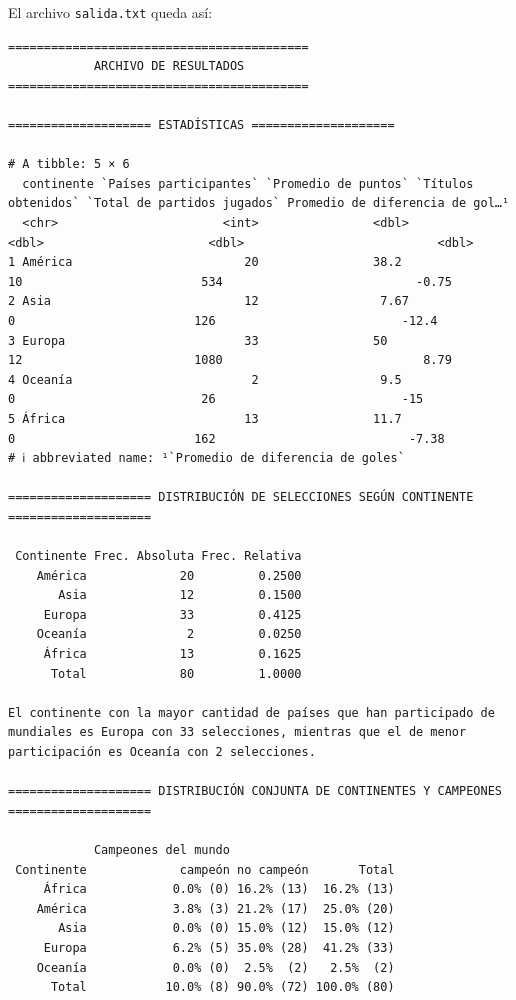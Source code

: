 \documentclass[
]{book}
\begin{document}
El archivo \texttt{salida.txt} queda así:

\begin{verbatim}
==========================================
            ARCHIVO DE RESULTADOS         
==========================================

==================== ESTADÍSTICAS ====================

# A tibble: 5 × 6
  continente `Países participantes` `Promedio de puntos` `Títulos obtenidos` `Total de partidos jugados` Promedio de diferencia de gol…¹
  <chr>                       <int>                <dbl>               <dbl>                       <dbl>                           <dbl>
1 América                        20                38.2                   10                         534                           -0.75
2 Asia                           12                 7.67                   0                         126                          -12.4 
3 Europa                         33                50                     12                        1080                            8.79
4 Oceanía                         2                 9.5                    0                          26                          -15   
5 África                         13                11.7                    0                         162                           -7.38
# ℹ abbreviated name: ¹​`Promedio de diferencia de goles`

==================== DISTRIBUCIÓN DE SELECCIONES SEGÚN CONTINENTE ====================

 Continente Frec. Absoluta Frec. Relativa
    América             20         0.2500
       Asia             12         0.1500
     Europa             33         0.4125
    Oceanía              2         0.0250
     África             13         0.1625
      Total             80         1.0000

El continente con la mayor cantidad de países que han participado de mundiales es Europa con 33 selecciones, mientras que el de menor participación es Oceanía con 2 selecciones.

==================== DISTRIBUCIÓN CONJUNTA DE CONTINENTES Y CAMPEONES ====================

            Campeones del mundo                       
 Continente             campeón no campeón       Total
     África            0.0% (0) 16.2% (13)  16.2% (13)
    América            3.8% (3) 21.2% (17)  25.0% (20)
       Asia            0.0% (0) 15.0% (12)  15.0% (12)
     Europa            6.2% (5) 35.0% (28)  41.2% (33)
    Oceanía            0.0% (0)  2.5%  (2)   2.5%  (2)
      Total           10.0% (8) 90.0% (72) 100.0% (80)


\end{verbatim}
\end{document}

